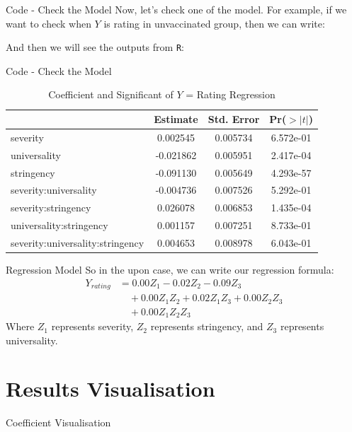 \documentclass{beamer}
\begin{document}
\begin{frame}{Code - Check the Model}
\noindent Now, let's check one of the model. For example, if we want to check when $Y$ is rating in unvaccinated group, then we can write:

\noindent And then we will see the outputs from \texttt{R}:
\end{frame}
\begin{frame}{Code - Check the Model}
\begin{table}[h]
    \centering
    \caption{Coefficient and Significant of $Y$ = Rating Regression}
    \begin{tabular}{lccc}
        \hline
        & Estimate & Std. Error & Pr($>|t|$)\\
        \hline
        severity & 0.002545 & 0.005734 & 6.572e-01\\
        universality & -0.021862 & 0.005951 & 2.417e-04\\
        stringency & -0.091130 & 0.005649 & 4.293e-57\\
        severity:universality & -0.004736 & 0.007526 & 5.292e-01\\
        severity:stringency & 0.026078 & 0.006853  & 1.435e-04\\
        universality:stringency & 0.001157 & 0.007251 & 8.733e-01\\
        severity:universality:stringency & 0.004653 & 0.008978 & 6.043e-01\\
        \hline
    \end{tabular}
\end{table}
\end{frame}

\begin{frame}{Regression Model}
\noindent So in the upon case, we can write our regression formula:
\begin{align*}
	Y_{rating} &= 0.00 Z_1 - 0.02 Z_2 - 0.09 Z_3 \\
	&\quad + 0.00 Z_1 Z_2 + 0.02 Z_1 Z_3 + 0.00 Z_2 Z_3 \\
	&\quad + 0.00 Z_1 Z_2 Z_3
\end{align*}
\noindent Where $Z_1$ represents severity, $Z_2$ represents stringency, and $Z_3$ represents universality.
\end{frame}

\section{Results Visualisation}
\begin{frame}{Coefficient Visualisation}

\end{frame}
\end{document}

